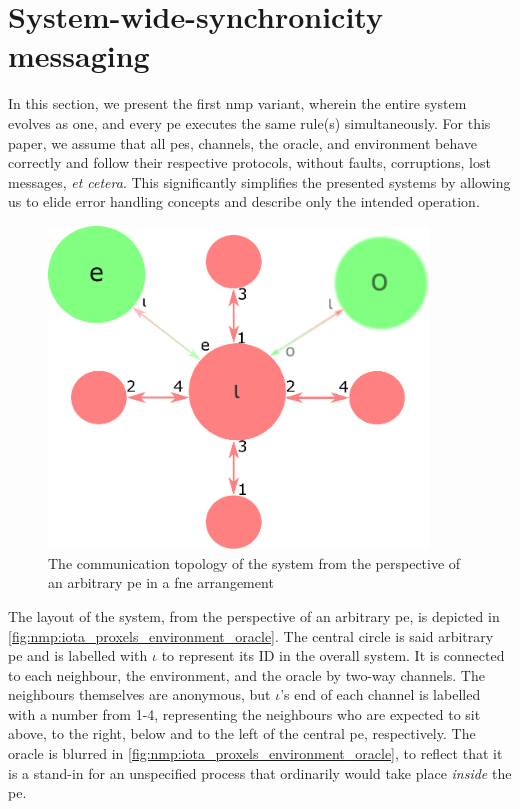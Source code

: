 \section{\label{sec:nmp:systemwide}System-wide-synchronicity messaging}

\cpresetrulenumber

In this section, we present the first \gls{nmp} variant, wherein the entire system evolves as one, and every \gls{pe} executes the same rule(s) simultaneously.  For this paper, we assume that all \glspl{pe}, channels, the oracle, and environment behave correctly and follow their respective protocols, without faults, corruptions, lost messages, \textit{et cetera}.  This significantly simplifies the presented systems by allowing us to elide error handling concepts and describe only the intended operation.

\begin{figure}
    \centering
    \includegraphics[width=0.9\textwidth]{chapters/nmp/images/iota_proxels_environment_oracle_v4.pdf}
    \caption[The communication topology of an \acrlong{nmp} system from the perspective of an arbitrary \acrshort{pe} in a \gls{fne} arrangement]{The communication topology of the system from the perspective of an arbitrary \gls{pe} in a \gls{fne} arrangement}
    \label{fig:nmp:iota_proxels_environment_oracle}
\end{figure}

The layout of the system, from the perspective of an arbitrary \gls{pe}, is depicted in \autoref{fig:nmp:iota_proxels_environment_oracle}.  The central circle is said arbitrary \gls{pe} and is labelled with \(\iota\) to represent its ID in the overall system.  It is connected to each neighbour, the environment, and the oracle by two-way channels.  The neighbours themselves are anonymous, but \(\iota\)'s end of each channel is labelled with a number from 1-4, representing the neighbours who are expected to sit above, to the right, below and to the left of the central \gls{pe}, respectively.  The oracle is blurred in \autoref{fig:nmp:iota_proxels_environment_oracle}, to reflect that it is a stand-in for an unspecified process that ordinarily would take place \emph{inside} the \gls{pe}.


